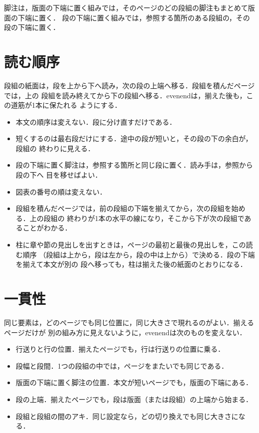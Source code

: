 \documentclass[twocolumn,paper=a4,fontsize=10pt]{jlreq}
\newcommand\sandan{\evenendcolumns[columnsep=1\zw]{3}}
\begin{document}
脚注は，版面の下端に置く組みでは，そのページのどの段組の脚注もまとめて版面の下端に置く．
段の下端に置く組みでは，参照する箇所のある段組の，その段の下端に置く．

\sandan
\section{読む順序}\label{sec:order}

段組の紙面は，段を上から下へ読み，次の段の上端へ移る．段組を積んだページでは，上の
段組を読み終えてから下の段組へ移る．evenendは，揃えた後も，この道筋が1本に保たれる
ようにする．
\begin{itemize}
  \item 本文の順序は変えない．段に分け直すだけである．
  \item 短くするのは最右段だけにする．途中の段が短いと，その段の下の余白が，段組の
    終わりに見える．
  \item 段の下端に置く脚注は，参照する箇所と同じ段に置く．読み手は，参照から段の下へ
    目を移せばよい．
  \item 図表の番号の順は変えない．
  \item 段組を積んだページでは，前の段組の下端を揃えてから，次の段組を始める．上の段組の
    終わりが1本の水平の線になり，そこから下が次の段組であることがわかる．
  \item 柱に章や節の見出しを出すときは，ページの最初と最後の見出しを，この読む順序
    （段組は上から，段は左から，段の中は上から）で決める．段の下端を揃えて本文が別の
    段へ移っても，柱は揃えた後の紙面のとおりになる．
\end{itemize}

\section{一貫性}\label{sec:consistency}

同じ要素は，どのページでも同じ位置に，同じ大きさで現れるのがよい．揃えるページだけが
別の組み方に見えないように，evenendは次のものを変えない．
\begin{itemize}
  \item 行送りと行の位置．揃えたページでも，行は行送りの位置に乗る．
  \item 段幅と段間．1つの段組の中では，ページをまたいでも同じである．
  \item 版面の下端に置く脚注の位置．本文が短いページでも，版面の下端にある．
  \item 段の上端．揃えたページでも，段は版面（または段組）の上端から始まる．
  \item 段組と段組の間のアキ．同じ設定なら，どの切り換えでも同じ大きさになる．
\end{itemize}
\end{document}
